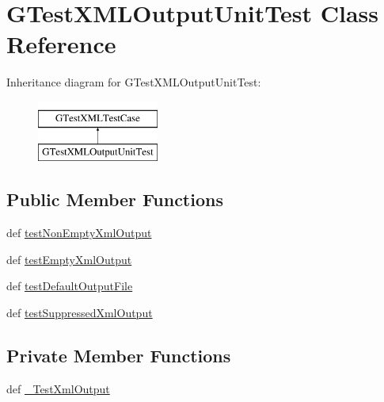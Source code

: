 \hypertarget{classgtest__xml__output__unittest_1_1GTestXMLOutputUnitTest}{\section{\-G\-Test\-X\-M\-L\-Output\-Unit\-Test \-Class \-Reference}
\label{d1/dc4/classgtest__xml__output__unittest_1_1GTestXMLOutputUnitTest}
}
\-Inheritance diagram for \-G\-Test\-X\-M\-L\-Output\-Unit\-Test\-:\begin{figure}[H]
\begin{center}
\leavevmode
\includegraphics[height=2.000000cm]{d1/dc4/classgtest__xml__output__unittest_1_1GTestXMLOutputUnitTest}
\end{center}
\end{figure}
\subsection*{\-Public \-Member \-Functions}
\begin{DoxyCompactItemize}
\item 
def \hyperlink{classgtest__xml__output__unittest_1_1GTestXMLOutputUnitTest_a06394e0d6fda9feb1fb5c6d97dcd5c28}{test\-Non\-Empty\-Xml\-Output}
\item 
def \hyperlink{classgtest__xml__output__unittest_1_1GTestXMLOutputUnitTest_a2a7fc9830d506776e10a2d2e6775a008}{test\-Empty\-Xml\-Output}
\item 
def \hyperlink{classgtest__xml__output__unittest_1_1GTestXMLOutputUnitTest_a16c8ccb17e494d9e9662656f555d64ab}{test\-Default\-Output\-File}
\item 
def \hyperlink{classgtest__xml__output__unittest_1_1GTestXMLOutputUnitTest_a6bf0f8633ad9ec8158be243e8a315ab5}{test\-Suppressed\-Xml\-Output}
\end{DoxyCompactItemize}
\subsection*{\-Private \-Member \-Functions}
\begin{DoxyCompactItemize}
\item 
def \hyperlink{classgtest__xml__output__unittest_1_1GTestXMLOutputUnitTest_a715507696a102c0c5831a34e10ea4b71}{\-\_\-\-Test\-Xml\-Output}
\end{DoxyCompactItemize}


